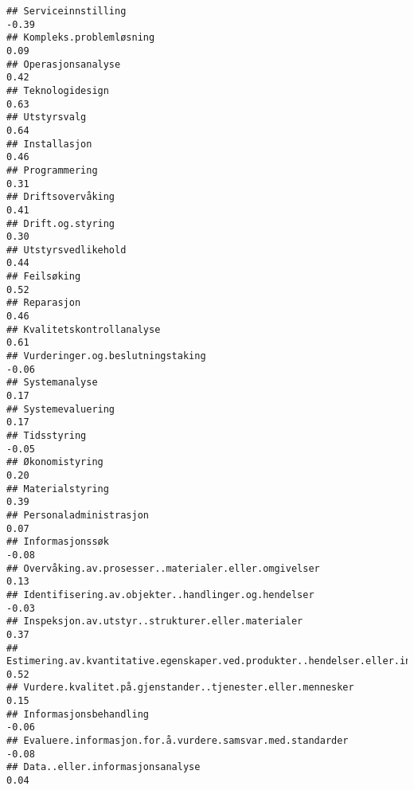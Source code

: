 \documentclass[
]{article}
\begin{document}
\begin{verbatim}
## Serviceinnstilling                                                               -0.39
## Kompleks.problemløsning                                                           0.09
## Operasjonsanalyse                                                                 0.42
## Teknologidesign                                                                   0.63
## Utstyrsvalg                                                                       0.64
## Installasjon                                                                      0.46
## Programmering                                                                     0.31
## Driftsovervåking                                                                  0.41
## Drift.og.styring                                                                  0.30
## Utstyrsvedlikehold                                                                0.44
## Feilsøking                                                                        0.52
## Reparasjon                                                                        0.46
## Kvalitetskontrollanalyse                                                          0.61
## Vurderinger.og.beslutningstaking                                                 -0.06
## Systemanalyse                                                                     0.17
## Systemevaluering                                                                  0.17
## Tidsstyring                                                                      -0.05
## Økonomistyring                                                                    0.20
## Materialstyring                                                                   0.39
## Personaladministrasjon                                                            0.07
## Informasjonssøk                                                                  -0.08
## Overvåking.av.prosesser..materialer.eller.omgivelser                              0.13
## Identifisering.av.objekter..handlinger.og.hendelser                              -0.03
## Inspeksjon.av.utstyr..strukturer.eller.materialer                                 0.37
## Estimering.av.kvantitative.egenskaper.ved.produkter..hendelser.eller.informasjon  0.52
## Vurdere.kvalitet.på.gjenstander..tjenester.eller.mennesker                        0.15
## Informasjonsbehandling                                                           -0.06
## Evaluere.informasjon.for.å.vurdere.samsvar.med.standarder                        -0.08
## Data..eller.informasjonsanalyse                                                   0.04

\end{verbatim}
\end{document}
